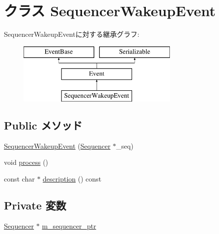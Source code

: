 \hypertarget{classSequencer_1_1SequencerWakeupEvent}{
\section{クラス SequencerWakeupEvent}
\label{classSequencer_1_1SequencerWakeupEvent}
}
SequencerWakeupEventに対する継承グラフ:\begin{figure}[H]
\begin{center}
\leavevmode
\includegraphics[height=3cm]{classSequencer_1_1SequencerWakeupEvent}
\end{center}
\end{figure}
\subsection*{Public メソッド}
\begin{DoxyCompactItemize}
\item 
\hyperlink{classSequencer_1_1SequencerWakeupEvent_afea1c2d8450af8d50f29d6c1158157ba}{SequencerWakeupEvent} (\hyperlink{classSequencer}{Sequencer} $\ast$\_\-seq)
\item 
void \hyperlink{classSequencer_1_1SequencerWakeupEvent_a2e9c5136d19b1a95fc427e0852deab5c}{process} ()
\item 
const char $\ast$ \hyperlink{classSequencer_1_1SequencerWakeupEvent_a2bd90422eece9190794479e08092a252}{description} () const 
\end{DoxyCompactItemize}
\subsection*{Private 変数}
\begin{DoxyCompactItemize}
\item 
\hyperlink{classSequencer}{Sequencer} $\ast$ \hyperlink{classSequencer_1_1SequencerWakeupEvent_a67a78e02404a00d58ba9d94bdc85e0e4}{m\_\-sequencer\_\-ptr}
\end{DoxyCompactItemize}


